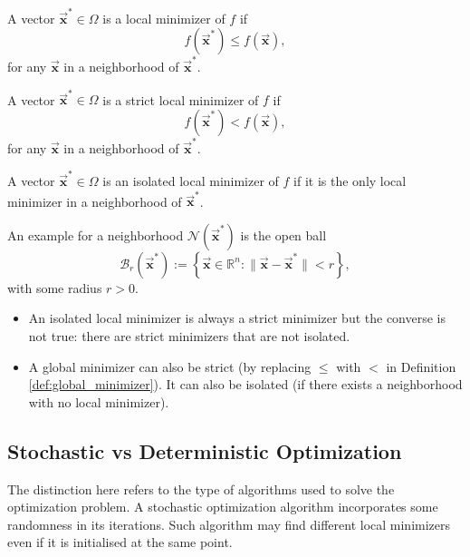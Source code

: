 \documentclass[9pt, headings=standardclasses, parskip=half]{scrartcl}
\renewcommand{\emph}[1]{\textcolor{mypurple}{#1}}
\newcommand{\vect}[1]{\vec{\boldsymbol{#1}}}
\begin{document}
\begin{definition}\label{def:local_minimizer}
A vector \(\vect{x}^{*}\in\Omega\) is a \emph{local minimizer} of \(f\) if
\[
f(\vect{x}^{*})\leq f(\vect{x}),
\]
for any \(\vect{x}\) in a neighborhood of \(\vect{x}^{*}\).
\end{definition}

\begin{definition}\label{def:strict_local_minimizer}
A vector \(\vect{x}^{*}\in\Omega\) is a \emph{strict local minimizer} of \(f\) if
\[
f(\vect{x}^{*})<f(\vect{x}),
\]
for any \(\vect{x}\) in a neighborhood of \(\vect{x}^{*}\).
\end{definition}

\begin{definition}
A vector \(\vect{x}^{*}\in\Omega\) is an \emph{isolated local minimizer} of \(f\) if it is the only local minimizer in a neighborhood of \(\vect{x}^{*}\).
\end{definition}


\begin{remark}
  An example for a neighborhood \(\mathcal{N}(\vect{x}^{*})\) is the open ball
\[
\mathcal{B}_{r}(\vect{x}^{*}) := \left\{ \vect{x}\in\mathbb{R}^{n} : \|\vect{x}-\vect{x}^{*}\|<r \right\},
\]
with some radius \(r>0\).
\end{remark}

\begin{remark}\leavevmode %
\begin{itemize}
  \item An isolated local minimizer is always a strict minimizer but the converse is not true: there are strict minimizers that are not isolated.
  \item A global minimizer can also be strict (by replacing \(\leq\) with \(<\) in Definition \ref{def:global_minimizer}). It can also be isolated (if there exists a neighborhood with no local minimizer).
\end{itemize}
\end{remark}


\subsection{Stochastic vs Deterministic Optimization}

The distinction here refers to the type of algorithms used to solve the optimization problem. 
A stochastic optimization algorithm incorporates some randomness in its iterations. 
Such algorithm may find different local minimizers even if it is initialised at the same point.
\end{document}
